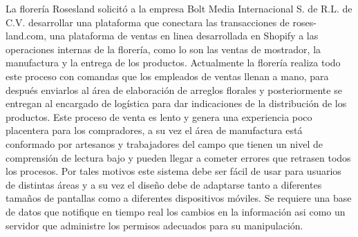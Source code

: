 La florería Rosesland solicitó a la empresa Bolt Media Internacional S. de R.L. de C.V. desarrollar una plataforma que conectara las transacciones de roses-land.com, una plataforma de ventas en linea desarrollada en Shopify a las operaciones internas de la florería, como lo son las ventas de mostrador, la manufactura y la entrega de los productos.
\vspace{0.8cm}
Actualmente la florería realiza todo este proceso con comandas que los empleados de ventas llenan a mano, para después enviarlos al área de elaboración de arreglos florales y posteriormente se entregan al encargado de logística para dar indicaciones de la distribución de los productos. Este proceso de venta es lento y genera una experiencia poco placentera para los compradores, a su vez el área de manufactura está conformado por artesanos y trabajadores del campo que tienen un nivel de comprensión de lectura bajo y pueden llegar a cometer errores que retrasen todos los procesos. Por tales motivos este sistema debe ser fácil de usar para usuarios de distintas áreas y a su vez el diseño debe de adaptarse tanto a diferentes tamaños de pantallas como a diferentes dispositivos móviles. Se requiere una base de datos que notifique en tiempo real los cambios en la información asi como un servidor que administre los permisos adecuados para su manipulación.